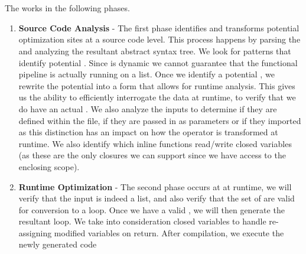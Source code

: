 \section{\Algorithm}

The \javascript \algorithm works in the following phases.  
\begin{enumerate}
  \item \textbf{Source Code Analysis} - The first phase identifies and transforms potential optimization sites at a source code level. This process happens by parsing   the \javascript and analyzing the resultant abstract syntax tree.  We look for patterns that identify potential \pipelines.  Since \javascript is dynamic we cannot guarantee that the functional pipeline is actually running on a list.
  Once we identify a potential \pipeline, we rewrite the potential \pipeline into a form that allows for runtime analysis.  This gives us the ability to efficiently interrogate the data at runtime, to verify that we do have an actual \pipeline.  We also analyze the \pipelineoperator inputs to determine if they are defined within the file, if they are passed in as parameters or if they imported as this distinction has an impact on how the operator is transformed at runtime.  We also identify which inline functions read/write closed variables (as these are the only closures we can support since we have access to the enclosing scope).

  \item \textbf{Runtime Optimization} - The second phase occurs at at runtime, we will verify that the input is indeed a list, and also verify that the set of \pipelineoperators are valid for conversion to a  loop.  Once we have a valid \pipeline, we will then generate the resultant  loop.  We take into consideration closed variables to handle re-assigning modified variables on return. After compilation, we execute the newly generated code
\end{enumerate}